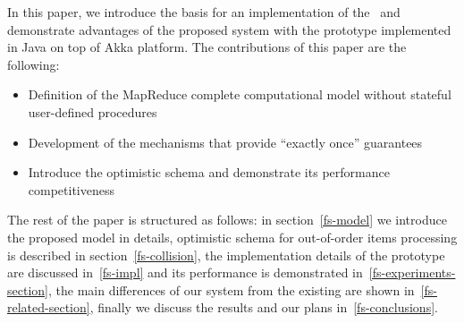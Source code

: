 In this paper, we introduce the basis for an implementation of the \FlameStream\ and demonstrate advantages of the proposed system with the prototype implemented in Java on top of Akka platform. The contributions of this paper are the following:

\begin {itemize}
\item Definition of the MapReduce complete computational model without stateful user-defined procedures
\item Development of the mechanisms that provide ``exactly once'' guarantees
\item Introduce the optimistic  schema and demonstrate its performance competitiveness
\end {itemize}

The rest of the paper is structured as follows: in section~\ref{fs-model} we introduce the proposed model in details, optimistic schema for out-of-order items processing is described in section~\ref{fs-collision}, the implementation details of the prototype are discussed in~\ref{fs-impl} and its performance is demonstrated in~\ref{fs-experiments-section}, the main differences of our system from the existing are shown in~\ref{fs-related-section}, finally we discuss the results and our plans in~\ref{fs-conclusions}.

\endinput

